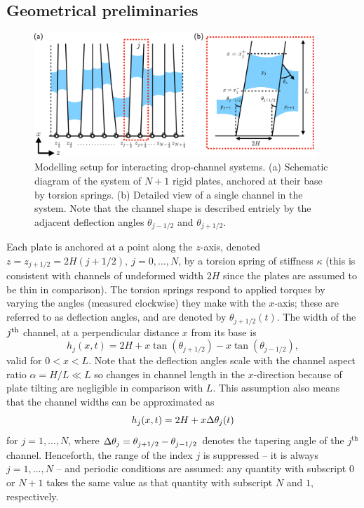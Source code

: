 \subsection{Geometrical preliminaries}
\begin{figure}[t]
\centering
\includegraphics[width =0.95\textwidth]{SchematicMultiplePlates.pdf}
\caption{Modelling setup for interacting drop-channel systems. (a) Schematic diagram of the system of $N+1$ rigid plates, anchored at their base by torsion springs. (b) Detailed view of a single channel in the system. Note that the channel shape is described entriely by the adjacent deflection angles $\theta_{j-1/2}$ and $ \theta_{j+1/2}$.}\label{fig:Model:schematic}
\end{figure}

Each plate is anchored at a point along the $z$-axis, denoted $z = z_{j+1/2} = 2H(j+1/2),~j = 0,\dots, N$, by a torsion spring of stiffness $\kappa$ (this is consistent with channels of undeformed width $2H$ since the plates are assumed to be thin in comparison).  The torsion springs respond to applied torques by varying the angles (measured clockwise) they make with the $x$-axis; these are referred to as deflection angles, and are denoted by $\theta_{j+1/2}(t)$. The width of the $j^{\text{th}}$ channel, at a perpendicular distance $x$ from its base is
\begin{equation}\label{E:Model:Modelling:ChannelWidth_withangles}
h_j(x,t) = 2H + x\tan\left( \theta_{j+1/2}\right) -x\tan \left(\theta_{j-1/2}\right),
\end{equation}
valid for $0 < x < L$. Note that the deflection angles scale with the channel aspect ratio $\alpha  = H/L \ll L $ so  changes in channel length in the $x$-direction because of plate tilting are negligible in comparison with $L$. This assumption also means that the channel widths can be approximated as
\begin{equation}\label{E:Model:Modelling:ChannelWidth}
h_j(x,t) = 2H + x \Delta \theta_j(t)
\end{equation}
for $j = 1,\dots, N$, where $\Delta \theta_j  = \theta_{j+1/2} - \theta_{j-1/2}$ denotes the tapering angle of the $j^{\text{th}}$ channel. Henceforth, the range of the index $j$ is suppressed -- it is always $j = 1,\dots, N$ -- and periodic conditions are assumed: any quantity with subscript $ 0$ or $N+1$ takes the same value as that quantity with subscript $N$ and $1$, respectively.

